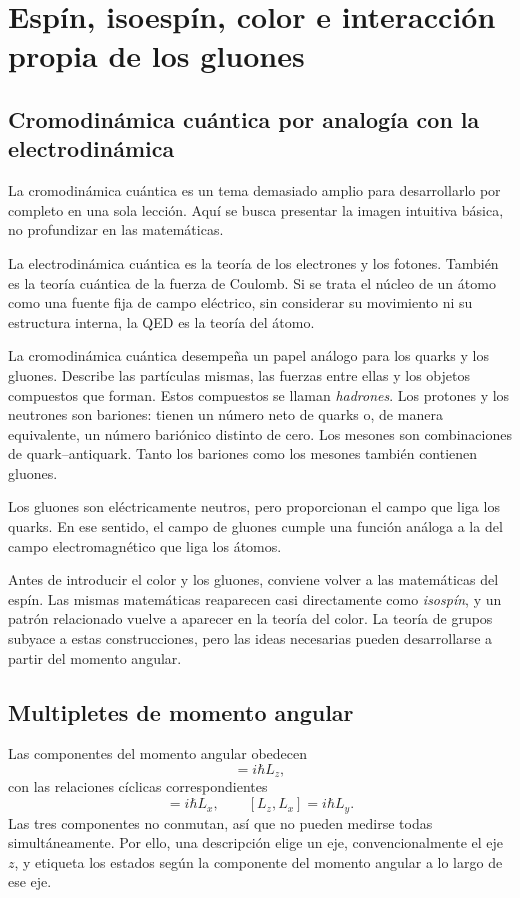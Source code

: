 \chapter{Espín, isoespín, color e interacción propia de los gluones}

\section{Cromodinámica cuántica por analogía con la electrodinámica}

La cromodinámica cuántica es un tema demasiado amplio para desarrollarlo por completo en una sola lección. Aquí se busca presentar la imagen intuitiva básica, no profundizar en las matemáticas.

La electrodinámica cuántica es la teoría de los electrones y los fotones. También es la teoría cuántica de la fuerza de Coulomb. Si se trata el núcleo de un átomo como una fuente fija de campo eléctrico, sin considerar su movimiento ni su estructura interna, la QED es la teoría del átomo.

La cromodinámica cuántica desempeña un papel análogo para los quarks y los gluones. Describe las partículas mismas, las fuerzas entre ellas y los objetos compuestos que forman. Estos compuestos se llaman \emph{hadrones}. Los protones y los neutrones son bariones: tienen un número neto de quarks o, de manera equivalente, un número bariónico distinto de cero. Los mesones son combinaciones de quark--antiquark. Tanto los bariones como los mesones también contienen gluones.

Los gluones son eléctricamente neutros, pero proporcionan el campo que liga los quarks. En ese sentido, el campo de gluones cumple una función análoga a la del campo electromagnético que liga los átomos.

Antes de introducir el color y los gluones, conviene volver a las matemáticas del espín. Las mismas matemáticas reaparecen casi directamente como \emph{isospín}, y un patrón relacionado vuelve a aparecer en la teoría del color. La teoría de grupos subyace a estas construcciones, pero las ideas necesarias pueden desarrollarse a partir del momento angular.

\section{Multipletes de momento angular}

Las componentes del momento angular obedecen
\begin{equation}
[L_x,L_y]=i\hbar L_z,
\end{equation}
con las relaciones cíclicas correspondientes
\begin{equation}
[L_y,L_z]=i\hbar L_x,
\qquad
[L_z,L_x]=i\hbar L_y.
\end{equation}
Las tres componentes no conmutan, así que no pueden medirse todas simultáneamente. Por ello, una descripción elige un eje, convencionalmente el eje \(z\), y etiqueta los estados según la componente del momento angular a lo largo de ese eje.

